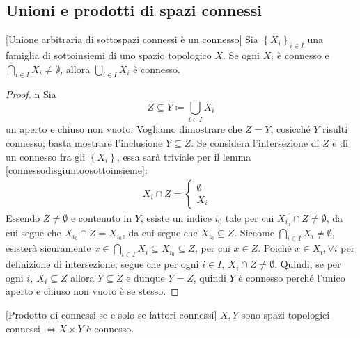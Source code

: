 \subsection{Unioni e prodotti di spazi connessi}
\begin{theorem}{}[Unione arbitraria di sottospazi connessi è un connesso]\label{unione sottospazi connessi}
Sia $\left\{ X_i \right\}_{i\in I}$ una famiglia di sottoinsiemi di uno spazio topologico $X$. Se ogni $X_i$ è connesso e $\bigcap_{i\in I}X_i\neq\emptyset$, allora $\bigcup_{i\in I}X_i$ è connesso.	
\end{theorem}
\begin{proof}{n}
	Sia
	\begin{equation*}
		Z\subseteq Y\coloneqq \bigcup_{i\in I}X_i
	\end{equation*}
	un aperto e chiuso non vuoto. Vogliamo dimostrare che $Z=Y$, cosicché $Y$ risulti connesso; basta mostrare l'inclusione $Y\subseteq Z$. Se considera l'intersezione di $Z$ e di un connesso fra gli $\left\{X_i\right\}$, essa sarà triviale per il lemma \ref{connessodisgiuntoosottoinsieme}:
	\begin{gather*}
		X_i \cap Z = \begin{cases}
			\emptyset & \\
			X_i	&		
		\end{cases}
	\end{gather*}
	Essendo $Z\neq\emptyset$ e contenuto in $Y$, esiste un indice $i_0$ tale per cui $X_{i_0}\cap Z\neq \emptyset$, da cui segue che $X_{i_0}\cap Z=X_{i_0}$, da cui segue che $X_{i_0}\subseteq Z $. Siccome $	\bigcap_{i\in I}X_i\neq\emptyset$, esisterà sicuramente $x\in\bigcap_{i\in I}X_i\subseteq X_{i_0}\subseteq Z$, per cui $x\in Z$. Poiché $x\in X_i, \forall i$ per definizione di intersezione, segue che per ogni $i\in I, \ X_i\cap Z\neq\emptyset$. Quindi, se per ogni $i,\ X_i\subseteq Z $ allora $Y\subseteq Z$ e dunque $Y=Z$, quindi $Y$ è connesso perché l'unico aperto e chiuso non vuoto è se stesso.\qedhere
\end{proof}
\begin{theorem}{}[Prodotto di connessi se e solo se fattori connessi]\label{prodotto connessi}
$X, Y$ sono spazi topologici connessi $\iff X\times Y$ è connesso.	
\end{theorem}

